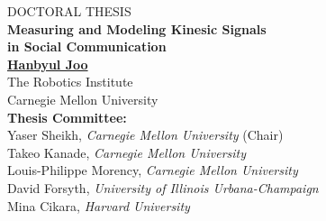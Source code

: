 \begin{center}
\textsc{\Large DOCTORAL  THESIS}\\[1cm]	
{ \huge \bfseries Measuring and Modeling Kinesic Signals \\in Social Communication}\\
\vspace{1cm}
{\Large \href{http://cs.cmu.edu/~hanbyulj}{\textbf{Hanbyul Joo}}\\
\vspace{0.5cm}
The Robotics Institute\\
Carnegie Mellon University\\

\textbf{Thesis Committee:}\\
\large
Yaser Sheikh, \emph{Carnegie Mellon University} (Chair)\\
Takeo Kanade, \emph{Carnegie Mellon University} \\ 
Louis-Philippe Morency, \emph{Carnegie Mellon University}\\ 
David Forsyth, \emph{University of Illinois Urbana-Champaign}\\
Mina Cikara, \emph{Harvard University} 
}


\end{center}

